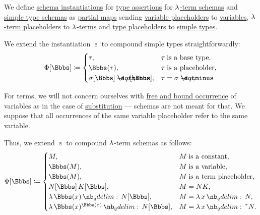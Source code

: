 \begin{definition}\label{def:lambda_schema_instantiation}
  We define \hyperref[con:schemas_and_instances]{schema instantiations} for \hyperref[def:type_assertion]{type assertions} for \hyperref[def:lambda_term_schema]{\( \mathrm{\lambda} \)-term schemas} and \hyperref[def:simple_type_schema]{simple type schemas} as \hyperref[def:set_valued_map/partial]{partial maps} sending \hyperref[def:lambda_term_schema]{variable placeholders} to \hyperref[def:lambda_term]{variables}, \hyperref[def:lambda_term_schema]{\( \mathrm{\lambda} \)-term placeholders} to \hyperref[def:lambda_term]{\( \mathrm{\lambda} \)-terms} and \hyperref[def:simple_type_schema]{type placeholders} to \hyperref[def:simple_type]{simple types}.

  \begin{thmenum}
     We extend the instantiation \( \Bbbs \) to compound simple types straightforwardly:
    \begin{equation}\label{eq:def:lambda_schema_instantiation/types}
      \Phi[\Bbbs] \coloneqq \begin{cases}
        \tau,                                  &\tau \T{is a base type},   \\
        \Bbbs(\tau),                           &\tau \T{is a placeholder}, \\
        \sigma[\Bbbs] \synimplies \rho[\Bbbs], &\tau = \sigma \synimplies \rho,  \\
      \end{cases}
    \end{equation}

     For terms, we will not concern ourselves with \hyperref[def:lambda_variable_occurrence]{free and bound occurrence} of variables as in the case of \hyperref[def:lambda_term_substitution]{substitution} --- schemas are not meant for that. We suppose that all occurrences of the same variable placeholder refer to the same variable.

    Thus, we extend \( \Bbbs \) to compound \( \mathrm{\lambda} \)-term schemas as follows:
    \begin{equation}\label{eq:def:lambda_schema_instantiation/terms}
      \Phi[\Bbbs] \coloneqq \begin{cases}
        M,                                       &M \T{is a constant},         \\
        \Bbbs(M),                                &M \T{is a variable},         \\
        \Bbbs(M),                                &M \T{is a term placeholder}, \\
        N[\Bbbs] \thinspace K[\Bbbs],            &M = NK,                      \\
        \qabs {\Bbbs(x)} N[\Bbbs],               &M = \qabs x N,               \\
        \qabs {\Bbbs(x)^{\Bbbs(\tau)}} N[\Bbbs], &M = \qabs x^\tau N.        \\
      \end{cases}
    \end{equation}


\end{thmenum}
\end{definition}
